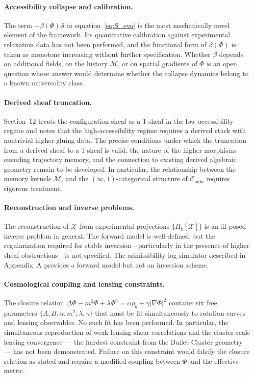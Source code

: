 \documentclass[11pt, a4paper, twocolumn]{article}
\newcommand{\X}{\mathcal{X}}
\newcommand{\Sfield}{\mathcal{S}}
\begin{document}
\paragraph{Accessibility collapse and calibration.}
The term $-\beta(\Phi)\Sfield$ in equation~\eqref{eq:S_evo} is the most
mechanically novel element of the framework. Its quantitative calibration
against experimental relaxation data has not been performed, and the functional
form of $\beta(\Phi)$ is taken as monotone increasing without further
specification. Whether $\beta$ depends on additional fields, on the history
$\mathcal{M}$, or on spatial gradients of $\Phi$ is an open question whose
answer would determine whether the collapse dynamics belong to a known
universality class.

\paragraph{Derived sheaf truncation.}
Section~12 treats the configuration sheaf as a 1-sheaf in the low-accessibility
regime and notes that the high-accessibility regime requires a derived stack
with nontrivial higher gluing data. The precise conditions under which the
truncation from a derived sheaf to a 1-sheaf is valid, the nature of the higher
morphisms encoding trajectory memory, and the connection to existing derived
algebraic geometry remain to be developed. In particular, the relationship
between the memory kernels $\mathcal{M}_i$ and the $(\infty,1)$-categorical
structure of $\mathcal{C}_{\mathrm{adm}}$ requires rigorous treatment.

\paragraph{Reconstruction and inverse problems.}
The reconstruction of $\X$ from experimental projections $\{\Pi_k[\X]\}$ is
an ill-posed inverse problem in general. The forward model is well-defined, but
the regularization required for stable inversion---particularly in the presence
of higher sheaf obstructions---is not specified. The admissibility log simulator
described in Appendix~A provides a forward model but not an inversion scheme.

\paragraph{Cosmological coupling and lensing constraints.}
The closure relation $\Delta\Phi - m^2\Phi + \lambda\Phi^3 = \alpha\rho_b +
\gamma|\nabla\Phi|^2$ contains six free parameters $\{A,B,\alpha,m^2,\lambda,
\gamma\}$ that must be fit simultaneously to rotation curves and lensing
observables. No such fit has been performed. In particular, the simultaneous
reproduction of weak lensing shear correlations and the cluster-scale lensing
convergence --- the hardest constraint from the Bullet Cluster geometry --- has
not been demonstrated. Failure on this constraint would falsify the closure
relation as stated and require a modified coupling between $\Phi$ and the
effective metric.
\end{document}
